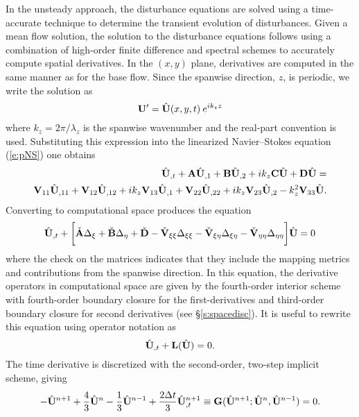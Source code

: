 In the unsteady approach, the disturbance equations are solved using a
time-accurate technique to determine the transient evolution of disturbances.
Given a mean flow solution, the solution to the disturbance equations follows
using a combination of high-order finite difference and spectral schemes to
accurately compute spatial derivatives.  In the $(x,y)$ plane, derivatives are
computed in the same manner as for the base flow.  Since the spanwise
direction, $z$, is periodic, we write the solution as
%
\begin{equation}
  {\bf U}' = {\hat{\bf U}}(x,y,t) \: e^{i k_z z }
\end{equation}
%
where $k_z = 2\pi/\lambda_z$ is the spanwise wavenumber and the real-part
convention is used.  Substituting this expression into the linearized
Navier--Stokes equation (\ref{e:pNS}) one obtains
%
\begin{eqnarray} \label{e:fNS}
  {\hat{\bf U}}_{,t} + {\bf A} {\hat{\bf U}}_{,1} + {\bf B} {\hat{\bf U}}_{,2} + i k_z {\bf C} {\hat{\bf U}} + {\bf D} {\hat{\bf U}} =
  \nonumber \\
  {{\bf V}_{11}} {\hat{\bf U}}_{,11} + {{\bf V}_{12}} {\hat{\bf U}}_{,12} +
  i k_z {{\bf V}_{13}} {\hat{\bf U}}_{,1} + {{\bf V}_{22}} {\hat{\bf U}}_{,22} +
  i k_z {{\bf V}_{23}} {\hat{\bf U}}_{,2} - k_z^2 {{\bf V}_{33}} {\hat{\bf U}} .
\end{eqnarray}
%
Converting to computational space produces the equation
%
\begin{eqnarray}
  {\hat{\bf U}}_{,t} + \bigg[ 
              \check{{\bf A}} \Delta_{\xi} + 
              \check{{\bf B}} \Delta_{\eta} + 
              \check{{\bf D}} -
              \check{\bf V}_{\xi\xi}   \Delta_{\xi\xi}  - 
              \check{\bf V}_{\xi\eta}  \Delta_{\xi\eta} -
              \check{\bf V}_{\eta\eta} \Delta_{\eta\eta} 
              \bigg] {\hat{\bf U}} = 0
\end{eqnarray}
%
where the check on the matrices indicates that they include the mapping
metrics and contributions from the spanwise direction.  In this equation, the
derivative operators in computational space are given by the fourth-order
interior scheme with fourth-order boundary closure for the first-derivatives
and third-order boundary closure for second derivatives (see
\S\ref{s:spacedisc}).  It is useful to rewrite this equation using operator
notation as
%
\begin{equation}
  {\hat{\bf U}}_{,t} + {\bf L}({\hat{\bf U}}) = 0 .
\end{equation}
%
The time derivative is discretized with the second-order, two-step implicit
scheme, giving
%
\begin{eqnarray}
  - {\hat{\bf U}}^{n+1} + \frac{4}{3} {\hat{\bf U}}^{n} - \frac{1}{3} {\hat{\bf U}}^{n-1} + 
    \frac{2\Delta t}{3} {\hat{\bf U}}^{n+1}_{,t} \equiv
    {\bf G}({\hat{\bf U}}^{n+1};{\hat{\bf U}}^{n},{\hat{\bf U}}^{n-1}) = 0 . \label{e:2step}
\end{eqnarray}
